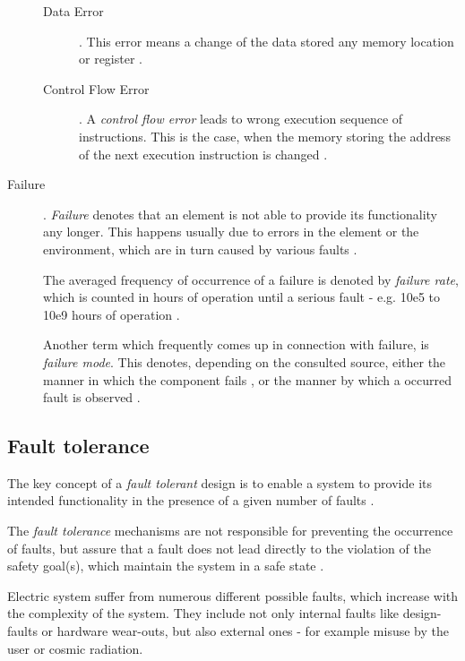 \begin{description}
	\begin{description}
	\item [Data Error] .
	This error means a change of the data stored any memory location or register \cite{elattar2007}.

	\item [Control Flow Error] .
	A \emph{control flow error} leads to wrong execution sequence of instructions. This is the case, when the memory storing the address of the next execution instruction is changed \cite{elattar2007}.
	\end{description}

\item [Failure] .
\emph{Failure} denotes that an element is not able to provide its functionality any longer. This happens usually due to errors in the element or the environment, which are in turn caused by various faults \cite{iso26262:1} \cite{nelson} \cite{autosar_glossary}.

The averaged frequency of occurrence of a failure is denoted by \emph{failure rate}, which is counted in hours of operation until a serious fault - e.g. 10e5 to 10e9 hours of operation \cite{rodrigues2011}.

Another term which frequently comes up in connection with failure, is \emph{failure mode}. This denotes, depending on the consulted source, either the manner in which the component fails \cite{international2006analysis}, or the manner by which a occurred fault is observed \cite{mil1980}.
\end{description}


\subsection{Fault tolerance}

\label{ch:fault_tolerance}

The key concept of a \emph{fault tolerant} design is to enable a system to provide its intended functionality in the presence of a given number of faults \cite{nelson}.

The \emph{fault tolerance} mechanisms are not responsible for preventing the occurrence of faults, but assure that a fault does not lead directly to the violation of the safety goal(s), which maintain the system in a safe state \cite{iso26262:1}.

Electric system suffer from numerous different possible faults, which increase with the complexity of the system. They include not only internal faults like design-faults or hardware wear-outs, but also external ones - for example misuse by the user or cosmic radiation.

